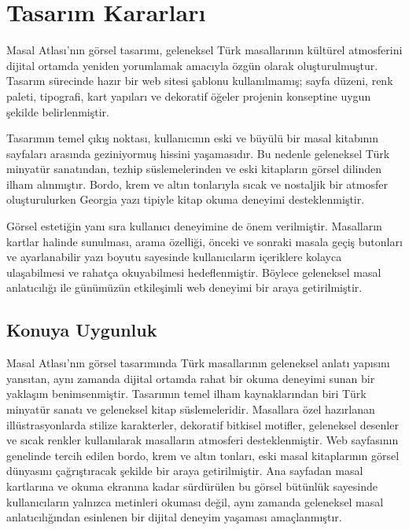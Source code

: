 \documentclass[12pt,a4paper]{article}
\begin{document}
\section{Tasarım Kararları}
{Masal Atlası'nın görsel tasarımı, geleneksel Türk masallarının kültürel atmosferini dijital ortamda yeniden yorumlamak amacıyla özgün olarak oluşturulmuştur. Tasarım sürecinde hazır bir web sitesi şablonu kullanılmamış; sayfa düzeni, renk paleti, tipografi, kart yapıları ve dekoratif öğeler projenin konseptine uygun şekilde belirlenmiştir.

Tasarımın temel çıkış noktası, kullanıcının eski ve büyülü bir masal kitabının sayfaları arasında geziniyormuş hissini yaşamasıdır. Bu nedenle geleneksel Türk minyatür sanatından, tezhip süslemelerinden ve eski kitapların görsel dilinden ilham alınmıştır. Bordo, krem ve altın tonlarıyla sıcak ve nostaljik bir atmosfer oluşturulurken Georgia yazı tipiyle kitap okuma deneyimi desteklenmiştir.

Görsel estetiğin yanı sıra kullanıcı deneyimine de önem verilmiştir. Masalların kartlar halinde sunulması, arama özelliği, önceki ve sonraki masala geçiş butonları ve ayarlanabilir yazı boyutu sayesinde kullanıcıların içeriklere kolayca ulaşabilmesi ve rahatça okuyabilmesi hedeflenmiştir. Böylece geleneksel masal anlatıcılığı ile günümüzün etkileşimli web deneyimi bir araya getirilmiştir.}

\subsection{Konuya Uygunluk}
Masal Atlası'nın görsel tasarımında Türk masallarının geleneksel anlatı yapısını yansıtan, aynı zamanda dijital ortamda rahat bir okuma deneyimi sunan bir yaklaşım benimsenmiştir. Tasarımın temel ilham kaynaklarından biri Türk minyatür sanatı ve geleneksel kitap süslemeleridir. Masallara özel hazırlanan illüstrasyonlarda stilize karakterler, dekoratif bitkisel motifler, geleneksel desenler ve sıcak renkler kullanılarak masalların atmosferi desteklenmiştir. Web sayfasının genelinde tercih edilen bordo, krem ve altın tonları, eski masal kitaplarının görsel dünyasını çağrıştıracak şekilde bir araya getirilmiştir. Ana sayfadan masal kartlarına ve okuma ekranına kadar sürdürülen bu görsel bütünlük sayesinde kullanıcıların yalnızca metinleri okuması değil, aynı zamanda geleneksel masal anlatıcılığından esinlenen bir dijital deneyim yaşaması amaçlanmıştır.
\end{document}

